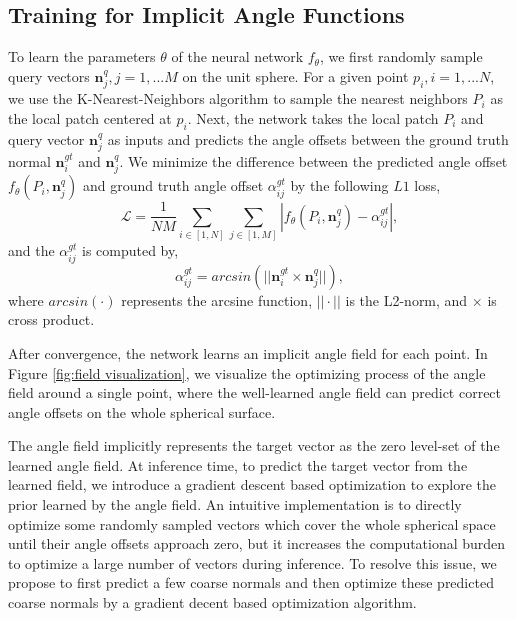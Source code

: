 \documentclass[letterpaper]{article} \usepackage{aaai23}  \usepackage{times}  \usepackage{helvet}  \usepackage{courier}  \usepackage[hyphens]{url}  \usepackage{graphicx} \urlstyle{rm} \def\UrlFont{\rm}  \usepackage{natbib}  \usepackage{caption} \frenchspacing  \setlength{\pdfpagewidth}{8.5in} \setlength{\pdfpageheight}{11in} \usepackage{algorithm}
\begin{document}
\subsection{Training for Implicit Angle Functions}
To learn the parameters $\theta$ of the neural network $f_\theta$, we first randomly sample query vectors $\boldsymbol{n}^q_j, j=1,...M$ on the unit sphere. For a given point $p_i, i=1,...N$, we use the K-Nearest-Neighbors algorithm to sample the nearest neighbors $P_i$ as the local patch centered at $p_i$. Next, the network takes the local patch $P_i$ and query vector $\boldsymbol{n}^q_j$ as inputs and predicts the angle offsets between the ground truth normal $\boldsymbol{n}^{gt}_{i}$ and $\boldsymbol{n}^q_j$. We minimize the difference between the predicted angle offset $f_\theta(P_i, \boldsymbol{n}^q_j)$ and ground truth angle offset $\alpha^{gt}_{ij}$ by the following $L1$ loss,
\begin{equation}
\label{eq:loss}
\mathcal{L}= \frac{1}{NM}\sum_{i \in [1,N]}{\sum_{j\in [1,M]}}|f_\theta(P_i, \boldsymbol{n}^q_j) - \alpha^{gt}_{ij}|,
\end{equation}
and the $\alpha^{gt}_{ij}$ is computed by,
\begin{equation}
\label{eq:compute gt}
\alpha^{gt}_{ij} = arcsin(||\boldsymbol{n}^{gt}_{i}\times \boldsymbol{n}^q_j||),
\end{equation}
where $arcsin(\cdot)$ represents the arcsine function, $||\cdot||$ is the L2-norm, and $\times$ is cross product.

After convergence, the network learns an implicit angle field for each point. In Figure \ref{fig:field visualization}, we visualize the optimizing process of the angle field around a single point, where the well-learned angle field can predict correct angle offsets on the whole spherical surface. 

The angle field implicitly represents the target vector as the zero level-set of the learned angle field. At inference time, to predict the target vector from the learned field, we introduce a gradient descent based optimization to explore the prior learned by the angle field. An intuitive implementation is to directly optimize some randomly sampled vectors which cover the whole spherical space until their angle offsets approach zero, but it increases the computational burden to optimize a large number of vectors during inference. To resolve this issue, we propose to first predict a few coarse normals and then optimize these predicted coarse normals by a gradient decent based optimization algorithm. 
\end{document}
